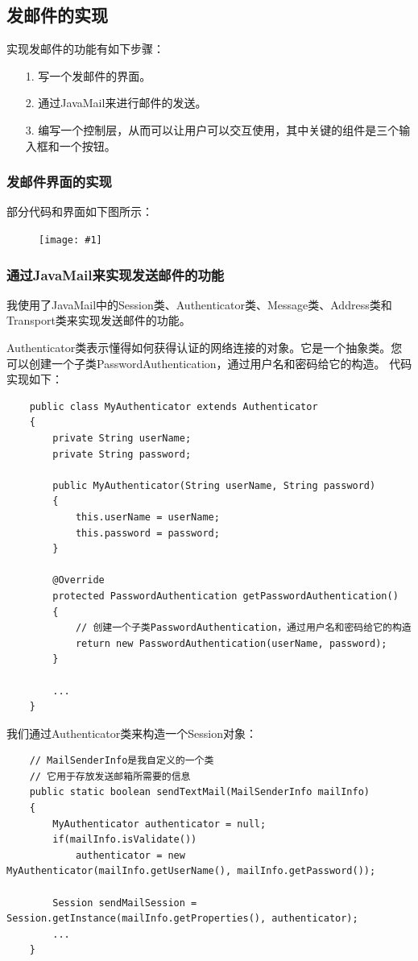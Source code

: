 \documentclass[a4paper,left=2.5cm,right=2.5cm,11pt]{article}
\newcommand{\fic}[1]{\begin{figure}[H]
		\center
		\texttt{[image: \#1]}
	\end{figure}}
\begin{document}
\clearpage

\subsection{发邮件的实现}
	实现发邮件的功能有如下步骤：
	\begin{itemize}
		\item[1.] 写一个发邮件的界面。
		\item[2.] 通过JavaMail来进行邮件的发送。
		\item[3.] 编写一个控制层，从而可以让用户可以交互使用，其中关键的组件是三个输入框和一个按钮。
	\end{itemize}

\subsubsection{发邮件界面的实现}
	部分代码和界面如下图所示：
	\fic{11.png}

\subsubsection{通过JavaMail来实现发送邮件的功能}
	我使用了JavaMail中的Session类、Authenticator类、Message类、Address类和Transport类来实现发送邮件的功能。\par

	Authenticator类表示懂得如何获得认证的网络连接的对象。它是一个抽象类。您可以创建一个子类PasswordAuthentication，通过用户名和密码给它的构造。
	代码实现如下：
	\begin{lstlisting}
	public class MyAuthenticator extends Authenticator
	{
		private String userName;
		private String password;

		public MyAuthenticator(String userName, String password)
		{
			this.userName = userName;
			this.password = password;
		}

		@Override
		protected PasswordAuthentication getPasswordAuthentication()
		{
			// 创建一个子类PasswordAuthentication，通过用户名和密码给它的构造
			return new PasswordAuthentication(userName, password);
		}

		...
	}
	\end{lstlisting}

	我们通过Authenticator类来构造一个Session对象：
	\begin{lstlisting}
	// MailSenderInfo是我自定义的一个类
	// 它用于存放发送邮箱所需要的信息
	public static boolean sendTextMail(MailSenderInfo mailInfo)
    {
        MyAuthenticator authenticator = null;
        if(mailInfo.isValidate())
            authenticator = new MyAuthenticator(mailInfo.getUserName(), mailInfo.getPassword());

        Session sendMailSession = Session.getInstance(mailInfo.getProperties(), authenticator);
		...
	}
	\end{lstlisting}
\end{document}
